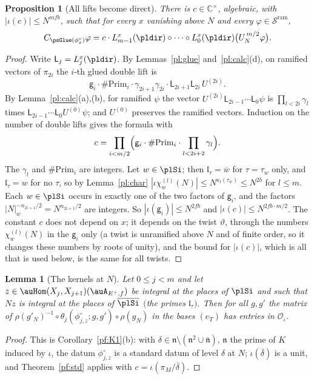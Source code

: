 \documentclass[10pt]{amsart}
\newtheorem{proposition}[theorem]{Proposition}
\newtheorem{lemma}[theorem]{Lemma}
\theoremstyle{definition}
\theoremstyle{remark}
\newcommand{\C}{\mathbb C}
\providecommand{\auO}{\mathcal O}
\providecommand{\auSram}{\mathcal S^{\mathrm{ram}}}
\providecommand{\aubar}[1]{\overline{#1}}
\begin{document}
\begin{proposition}[All lifts become direct]\label{pl:direct}
There is $c\in\C^\times$, algebraic, with $|\iota(c)|\le N^{mfb}$, such that for every $x$
vanishing above $N$ and every $\varphi\in\auSram$,
\[
C_{\psGlue(\phi^\circ_x)}\varphi=c\cdot L^x_{m-1}(\pldir)\circ\cdots\circ L^x_0(\pldir)\bigl(U_N^{\,
m/2}\varphi\bigr).
\]
\end{proposition}
\begin{proof}
Write $\mathsf L_j=L^x_j(\pldir)$. By Lemmas~\ref{pl:glue} and~\ref{pl:calc}(d), on ramified vectors of
$\pi_{2i}$ the $i$-th glued double lift is
\[
\mathsf g_i\cdot\#\mathrm{Prim}_i\cdot\gamma_{2i+1}\gamma_{2i}\cdot\mathsf L_{2i+1}\mathsf L_{2i}\,
U^{(2i)} .
\]
By Lemma~\ref{pl:calc}(a),(b), for ramified $\psi$ the vector $U^{(2i)}\mathsf L_{2i-1}\cdots\mathsf L_0
\psi$ is $\prod_{l<2i}\gamma_l$ times $\mathsf L_{2i-1}\cdots\mathsf L_0U^{(0)}\psi$; and $U^{(0)}$
preserves the ramified vectors. Induction on the number of double lifts gives the formula with
\[
c=\prod_{i<m/2}\Bigl(\mathsf g_i\cdot\#\mathrm{Prim}_i\cdot\prod_{l<2i+2}\gamma_l\Bigr).
\]
The $\gamma_l$ and $\#\mathrm{Prim}_i$ are integers. Let $w\in\plSi$; then $\mathfrak l_\tau=\aubar
w$ for $\tau=\tau_w$ only, and $\mathfrak l_\tau=w$ for no $\tau$, so by Lemma~\ref{pl:char}
$|\iota\chi^{(l)}_w(N)|\le N^{\kappa_l(\tau_w)}\le N^{2b}$ for $l\le m$. Each $w\in\plSi$ occurs
in exactly one of the two factors of $\mathsf g_i$, and the factors $|N|_w^{-n_{2i+1}/2}=N^{n_{2i+
1}/2}$ are integers. So $|\iota(\mathsf g_i)|\le N^{2fb}$ and $|\iota(c)|\le N^{2fb\cdot m/2}$.
The constant $c$ does not depend on $x$; it depends on the twist $\vartheta$, through the numbers
$\chi^{(l)}_w(N)$ in the $\mathsf g_i$ only (a twist is unramified above $N$ and of finite order, so
it changes these numbers by roots of unity), and the bound for $|\iota(c)|$, which is all that is
used below, is the same for all twists.
\end{proof}

\begin{lemma}[The kernels at $N$]\label{pl:kernelN}
Let $0\le j<m$ and let $z\in\auHom(X_j,X_{j+1})(\auA_{E^+,f})$ be integral at the places of
$\plSi$ and such that $Nz$ is integral at the places of $\aubar{\plSi}$ $($the primes $\mathfrak
l_\tau)$. Then for all $g,g'$ the matrix of $\rho(g'_N)^{-1}\circ\theta_j(\phi^\circ_{j,z};g,g')
\circ\rho(g_N)$ in the bases $(e_T)$ has entries in $\auO_\iota$.
\end{lemma}
\begin{proof} This is Corollary~\ref{pf:K1}(b): with $\delta\in\mathfrak n\setminus(\mathfrak n^2\cup\aubar{\mathfrak n})$,
$\mathfrak n$ the prime of $K$ induced by $\iota$, the datum $\phi^\circ_{j,z}$ is a standard datum of level $\delta$ at $N$;
$\iota(\aubar\delta)$ is a unit, and Theorem~\ref{pf:std} applies with $c=\iota(\pi_M/\aubar\delta)$.\end{proof}
\end{document}
